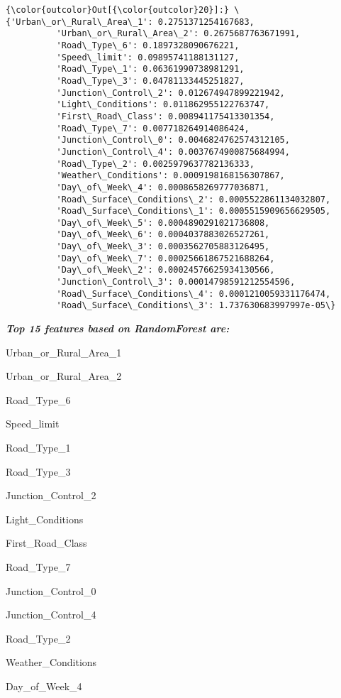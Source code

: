\documentclass[11pt]{article}
\begin{document}
\begin{Verbatim}[commandchars=\\\{\}]
{\color{outcolor}Out[{\color{outcolor}20}]:} \{'Urban\_or\_Rural\_Area\_1': 0.2751371254167683,
          'Urban\_or\_Rural\_Area\_2': 0.2675687763671991,
          'Road\_Type\_6': 0.1897328090676221,
          'Speed\_limit': 0.09895741188131127,
          'Road\_Type\_1': 0.06361990738981291,
          'Road\_Type\_3': 0.04781133445251827,
          'Junction\_Control\_2': 0.012674947899221942,
          'Light\_Conditions': 0.011862955122763747,
          'First\_Road\_Class': 0.008941175413301354,
          'Road\_Type\_7': 0.007718264914086424,
          'Junction\_Control\_0': 0.0046824762574312105,
          'Junction\_Control\_4': 0.0037674900875684994,
          'Road\_Type\_2': 0.0025979637782136333,
          'Weather\_Conditions': 0.0009198168156307867,
          'Day\_of\_Week\_4': 0.0008658269777036871,
          'Road\_Surface\_Conditions\_2': 0.0005522861134032807,
          'Road\_Surface\_Conditions\_1': 0.0005515909656629505,
          'Day\_of\_Week\_5': 0.0004890291021736808,
          'Day\_of\_Week\_6': 0.0004037883026527261,
          'Day\_of\_Week\_3': 0.0003562705883126495,
          'Day\_of\_Week\_7': 0.00025661867521688264,
          'Day\_of\_Week\_2': 0.00024576625934130566,
          'Junction\_Control\_3': 0.00014798591212554596,
          'Road\_Surface\_Conditions\_4': 0.0001210059331176474,
          'Road\_Surface\_Conditions\_3': 1.737630683997997e-05\}
\end{Verbatim}
            
    \textbf{\emph{Top 15 features based on RandomForest are:}}

Urban\_or\_Rural\_Area\_1

Urban\_or\_Rural\_Area\_2

Road\_Type\_6

Speed\_limit

Road\_Type\_1

Road\_Type\_3

Junction\_Control\_2

Light\_Conditions

First\_Road\_Class

Road\_Type\_7

Junction\_Control\_0

Junction\_Control\_4

Road\_Type\_2

Weather\_Conditions

Day\_of\_Week\_4
\end{document}
